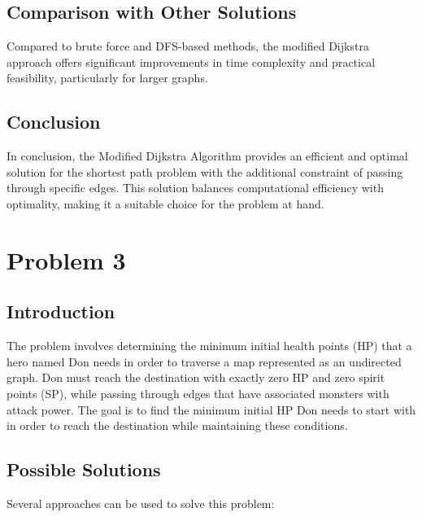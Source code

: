 \documentclass{article}
\begin{document}
\subsection{Comparison with Other Solutions}
Compared to brute force and DFS-based methods, the modified Dijkstra approach offers significant improvements in time complexity and practical feasibility, particularly for larger graphs.

\subsection{Conclusion}
In conclusion, the Modified Dijkstra Algorithm provides an efficient and optimal solution for the shortest path problem with the additional constraint of passing through specific edges. This solution balances computational efficiency with optimality, making it a suitable choice for the problem at hand.

\section{Problem 3}

\subsection{Introduction}
The problem involves determining the minimum initial health points (HP) that a hero named Don needs in order to traverse a map represented as an undirected graph. Don must reach the destination with exactly zero HP and zero spirit points (SP), while passing through edges that have associated monsters with attack power. The goal is to find the minimum initial HP Don needs to start with in order to reach the destination while maintaining these conditions.

\subsection{Possible Solutions}
Several approaches can be used to solve this problem:
\end{document}
